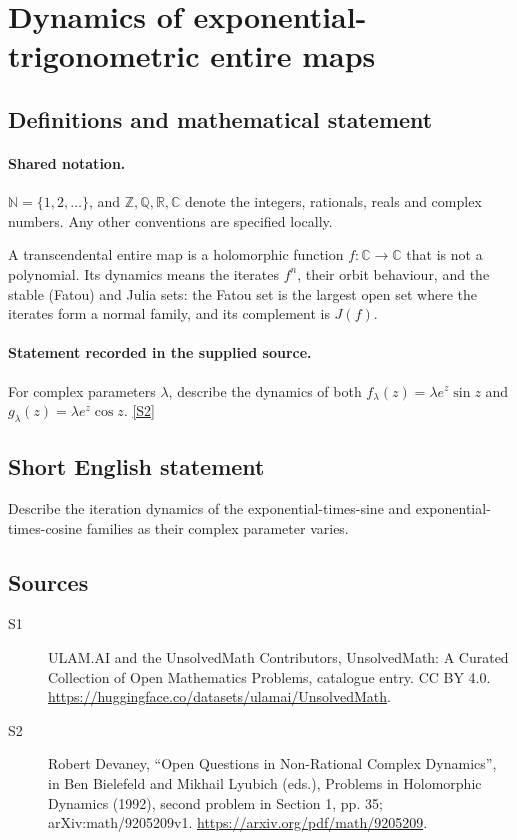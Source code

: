 \documentclass[11pt]{article}
\newcommand{\sref}[2]{\hyperlink{source:#1:#2}{[S#2]}}
\begin{document}
\section{Dynamics of exponential-trigonometric entire maps}\label{statement}

\subsection{Definitions and mathematical statement}

\paragraph{Shared notation.}$\mathbb N=\{1,2,\ldots\}$, and $\mathbb Z,\mathbb Q,\mathbb R,\mathbb C$ denote the integers, rationals, reals and complex numbers. Any other conventions are specified locally.


A transcendental entire map is a holomorphic function $f:\mathbb C\to\mathbb C$ that is not a polynomial. Its dynamics means the iterates $f^n$, their orbit behaviour, and the stable (Fatou) and Julia sets: the Fatou set is the largest open set where the iterates form a normal family, and its complement is $J(f)$.
\paragraph{Statement recorded in the supplied source.}
For complex parameters $\lambda$, describe the dynamics of both $f_\lambda(z)=\lambda e^z\sin z$ and $g_\lambda(z)=\lambda e^z\cos z$. \sref{statement}{2}
\subsection{Short English statement}
Describe the iteration dynamics of the exponential-times-sine and exponential-times-cosine families as their complex parameter varies.
\subsection{Sources}
\begin{description}
\item[\hypertarget{source:statement:1}{S1}] ULAM.AI and the UnsolvedMath Contributors, UnsolvedMath: A Curated Collection of Open Mathematics Problems, catalogue entry. CC BY 4.0. \url{https://huggingface.co/datasets/ulamai/UnsolvedMath}.
\item[\hypertarget{source:statement:2}{S2}] Robert Devaney, ``Open Questions in Non-Rational Complex Dynamics'', in Ben Bielefeld and Mikhail Lyubich (eds.), Problems in Holomorphic Dynamics (1992), second problem in Section 1, pp. 35; arXiv:math/9205209v1. \url{https://arxiv.org/pdf/math/9205209}.
\end{description}
\label{end:statement}
\end{document}
